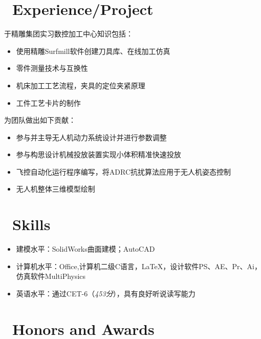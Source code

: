 \documentclass{resume}
\begin{document}
\section{\faUsers\ Experience/Project}

于精雕集团实习数控加工中心知识包括：
\begin{itemize}[parsep=0.5ex]
  \item 使用精雕Surfmill软件创建刀具库、在线加工仿真
  \item 零件测量技术与互换性
  \item 机床加工工艺流程，夹具的定位夹紧原理
  \item 工件工艺卡片的制作
\end{itemize}



为团队做出如下贡献：
\begin{itemize}[parsep=0.5ex]
  \item 参与并主导无人机动力系统设计并进行参数调整
  \item 参与构思设计机械投放装置实现小体积精准快速投放
  \item 飞控自动化运行程序编写，将ADRC抗扰算法应用于无人机姿态控制
  \item 无人机整体三维模型绘制
\end{itemize}





\section{\faCogs\ Skills}
\begin{itemize}[parsep=0.5ex]
  \item 建模水平：SolidWorks曲面建模；AutoCAD
  \item 计算机水平：Office,计算机二级C语言，\LaTeX，设计软件PS、AE、Pr、Ai，仿真软件MultiPhysics
  \item 英语水平：通过CET-6（\textit{453分}），具有良好听说读写能力
\end{itemize}

\section{\faTrophy\ Honors and Awards}



%
%
\end{document}
